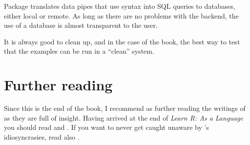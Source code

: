 \documentclass[krantz2]{krantz}\usepackage{knitr}
\begin{document}
\begin{explainbox}
Package  translates data pipes that use  syntax into SQL queries to databases, either local or remote. As long as there are no problems with the backend, the use of a database is almost transparent to the \Rlang user.
\end{explainbox}

\begin{infobox}
It is always good to clean up, and in the case of the book, the best way to test that the examples
can be run in a ``clean'' system.

\begin{knitrout}\footnotesize
{}\color{fgcolor}\begin{kframe}
\begin{alltt}
\hlstd{(}\hlstd{,}  \hlstd{=} \hlstd{)}
\hlstd{(}\hlstd{,}  \hlstd{=} \hlstd{)}
\end{alltt}
\end{kframe}
\end{knitrout}
\end{infobox}

\section{Further reading}
Since this is the end of the book, I recommend as further reading the writings of \citeauthor{Burns1998} as they are full of insight. Having arrived at the end of \emph{Learn R: As a Language} you should read  \autocite{Burns1998} and  \autocite{Burns2012}. If you want to never get caught unaware by \Rlang's idiosyncrasies, read also  \autocite{Burns2011}.





\backmatter

\printbibliography

\printindex

\printindex[rcatsidx]

\printindex[rindex]
\end{document}
